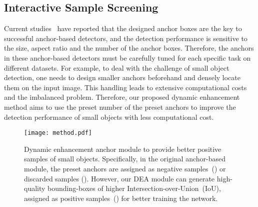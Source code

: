 \documentclass[journal]{IEEEtran}
\begin{document}
\subsection{Interactive Sample Screening} 
Current studies~\cite{tian2019fcos, wang2018sface} have reported that the designed anchor boxes are the key to successful anchor-based detectors, and the detection performance is sensitive to the size, aspect ratio and the number of the anchor boxes. Therefore, the anchors in these anchor-based detectors must be carefully tuned for each specific task on different datasets. For example, to deal with the challenge of small object detection, one needs to design smaller anchors beforehand and densely locate them on the input image. This handling leads to extensive computational costs and the imbalanced problem. Therefore, our proposed dynamic enhancement method aims to use the preset number of the preset anchors to improve the detection performance of small objects with less computational cost. 

\begin{figure}[t]
	\centering
	\texttt{[image: method.pdf]}
	\caption{Dynamic enhancement anchor module to provide better positive samples of small objects. Specifically, in the original anchor-based module, the preset anchors are assigned as negative samples~() or discarded samples (). However, our DEA module can generate high-quality bounding-boxes of higher Intersection-over-Union~(IoU), assigned as positive samples~() for better training the network.}
	\label{method}
\end{figure}
\end{document}
